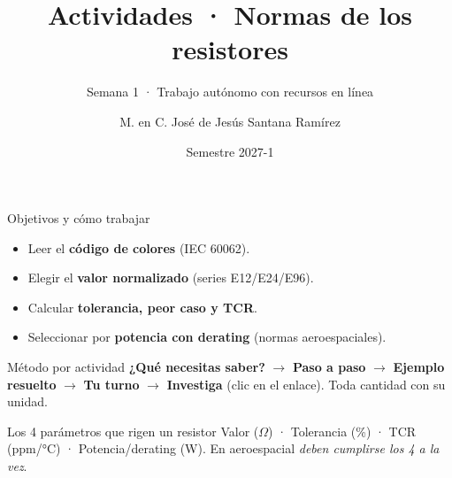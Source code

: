 \documentclass[aspectratio=169]{beamer}
\title[Actividades · Normas de resistores]{Actividades · Normas de los resistores}
\subtitle{Semana 1 · Trabajo autónomo con recursos en línea}
\institute{Licenciatura en Ingeniería Aeroespacial\\ UNAM · ENES Unidad Juriquilla}
\author{M. en C. José de Jesús Santana Ramírez}
\date{Semestre 2027-1}
\begin{document}
\begin{frame}[plain]
  \titlepage
\end{frame}

\begin{frame}{Objetivos y cómo trabajar}
  \begin{itemize}
    \item Leer el \textbf{código de colores} (IEC 60062).
    \item Elegir el \textbf{valor normalizado} (series E12/E24/E96).
    \item Calcular \textbf{tolerancia, peor caso y TCR}.
    \item Seleccionar por \textbf{potencia con derating} (normas aeroespaciales).
  \end{itemize}
  \pause
  \begin{block}{Método por actividad}
    \textbf{¿Qué necesitas saber?} $\rightarrow$ \textbf{Paso a paso} $\rightarrow$
    \textbf{Ejemplo resuelto} $\rightarrow$ \textbf{Tu turno} $\rightarrow$ \textbf{Investiga}
    (clic en el enlace). Toda cantidad con su unidad.
  \end{block}
  \pause
  \begin{block}{Los 4 parámetros que rigen un resistor}
    Valor ($\Omega$) · Tolerancia (\%) · TCR (ppm/°C) · Potencia/derating (W). En
    aeroespacial \emph{deben cumplirse los 4 a la vez}.
  \end{block}
\end{frame}
\end{document}
